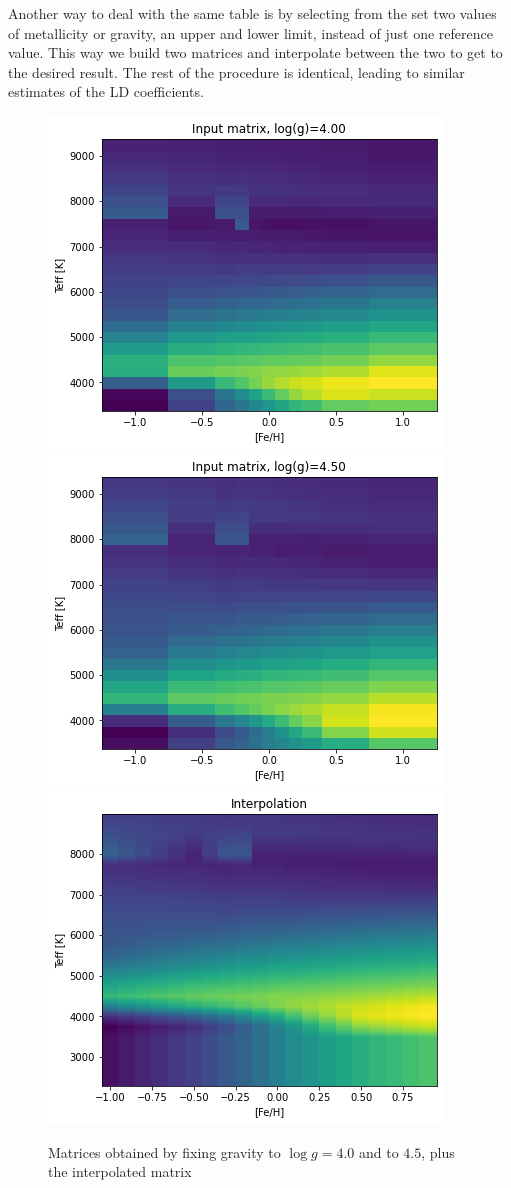 \documentclass{aa}
\begin{document}
\medskip

Another way to deal with the same table is by selecting from the set two values
of metallicity or gravity, an upper and lower limit, instead of just one reference 
value. This way we build two matrices and 
interpolate between the two to get to the desired result. The rest of the 
procedure is identical, leading to similar estimates of the LD coefficients.
\begin{figure}[h!]
    \centering  
    \includegraphics[scale=0.35, angle=0]{pictures/double_logg4}
    \includegraphics[scale=0.35, angle=0]{pictures/double_logg45}
    \includegraphics[scale=0.35, angle=0]{pictures/double_logg_interp}
    \caption{Matrices obtained by fixing gravity to $\log{g}=4.0$ and to $4.5$, plus the interpolated matrix}
\end{figure}
\end{document}
